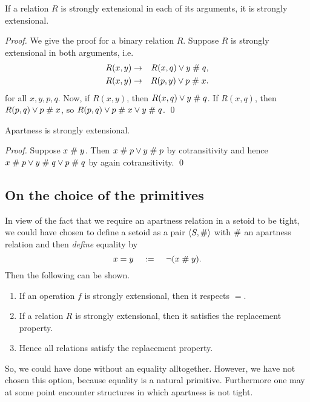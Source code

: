 \begin{lemma}
If a relation $R$ is strongly extensional in each of its arguments, it
is strongly extensional.
\end{lemma}

\begin{proof}
We give the proof for a binary relation $R$. Suppose $R$ is strongly
extensional in both arguments, i.e.
\begin{eqnarray*}
R(x,y) &\rightarrow & R(x,q)\vee y\mathrel{\#} q,\\
R(x,y) &\rightarrow & R(p,y)\vee p\mathrel{\#} x.
\end{eqnarray*}
for all $x,y,p,q$.
Now, if $R(x,y)$, then $R(x,q)\vee y\mathrel{\#} q$. If $R(x,q)$, then
$R(p,q)\vee p\mathrel{\#} x$, so $R(p,q)\vee p\mathrel{\#} x\vee y\mathrel{\#} q$. \qed
\end{proof}


\begin{lemma}\label{tapstrext}
Apartness is strongly extensional.
\end{lemma}

\begin{proof}
Suppose $x\mathrel{\#} y$. Then $x\mathrel{\#} p \vee y\mathrel{\#} p$ by cotransitivity
and hence $x\mathrel{\#} p \vee y\mathrel{\#} q \vee p\mathrel{\#} q$ by again
cotransitivity.
\qed
\end{proof}

\subsection{On the choice of the primitives}
In view of the fact that we require an apartness relation in  a setoid
to be tight, we could have chosen to define a setoid as a pair
$\langle S, \mathrel{\#}\rangle$ with $\mathrel{\#}$ an apartness relation and then
{\em define\/} equality by
$$x=y \;\;\;\; := \;\;\;\; \neg(x\mathrel{\#} y).$$ 
Then the following can be shown.
\begin{enumerate}
\item If an operation $f$ is strongly extensional, then it respects
$=$.
\item If a relation $R$ is strongly extensional, then it satisfies the
replacement property.
\item Hence all relations satisfy the replacement property.
\end{enumerate}

So, we could have done without an equality alltogether.  However, we
have not chosen this option, because equality is a natural
primitive. Furthermore one may at some point encounter structures in
which apartness is not tight.

